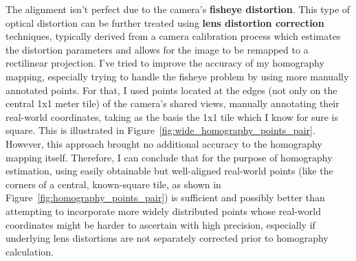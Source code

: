 \documentclass[12pt, a4paper]{article}
\begin{document}
The alignment isn't perfect due to the camera's \textbf{fisheye distortion}. This type of optical distortion can be further treated using \textbf{lens distortion correction} techniques, typically derived from a camera calibration process which estimates the distortion parameters and allows for the image to be remapped to a rectilinear projection. I've tried to improve the accuracy of my homography mapping, especially trying to handle the fisheye problem by using more manually annotated points. For that, I used points located at the edges (not only on the central 1x1 meter tile) of the camera's shared views, manually annotating their real-world coordinates, taking as the basis the 1x1 tile which I know for sure is square. This is illustrated in Figure~\ref{fig:wide_homography_points_pair}. However, this approach brought no additional accuracy to the homography mapping itself. Therefore, I can conclude that for the purpose of homography estimation, using easily obtainable but well-aligned real-world points (like the corners of a central, known-square tile, as shown in Figure~\ref{fig:homography_points_pair}) is sufficient and possibly better than attempting to incorporate more widely distributed points whose real-world coordinates might be harder to ascertain with high precision, especially if underlying lens distortions are not separately corrected prior to homography calculation.
\end{document}
